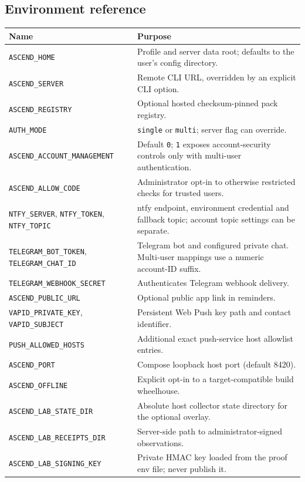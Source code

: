 \subsection{Environment reference}
\begin{longtable}{p{}p{}}
\textbf{Name} & \textbf{Purpose}\\\hline
\texttt{ASCEND\_HOME} & Profile and server data root; defaults to the user's config directory.\\
\texttt{ASCEND\_SERVER} & Remote CLI URL, overridden by an explicit CLI option.\\
\texttt{ASCEND\_REGISTRY} & Optional hosted checksum-pinned pack registry.\\
\texttt{AUTH\_MODE} & \texttt{single} or \texttt{multi}; server flag can override.\\
\texttt{ASCEND\_ACCOUNT\_MANAGEMENT} & Default \texttt{0}; \texttt{1} exposes account-security controls only with multi-user authentication.\\
\texttt{ASCEND\_ALLOW\_CODE} & Administrator opt-in to otherwise restricted checks for trusted users.\\
\texttt{NTFY\_SERVER}, \texttt{NTFY\_TOKEN}, \texttt{NTFY\_TOPIC} & ntfy endpoint, environment credential and fallback topic; account topic settings can be separate.\\
\texttt{TELEGRAM\_BOT\_TOKEN}, \texttt{TELEGRAM\_CHAT\_ID} & Telegram bot and configured private chat. Multi-user mappings use a numeric account-ID suffix.\\
\texttt{TELEGRAM\_WEBHOOK\_SECRET} & Authenticates Telegram webhook delivery.\\
\texttt{ASCEND\_PUBLIC\_URL} & Optional public app link in reminders.\\
\texttt{VAPID\_PRIVATE\_KEY}, \texttt{VAPID\_SUBJECT} & Persistent Web Push key path and contact identifier.\\
\texttt{PUSH\_ALLOWED\_HOSTS} & Additional exact push-service host allowlist entries.\\
\texttt{ASCEND\_PORT} & Compose loopback host port (default 8420).\\
\texttt{ASCEND\_OFFLINE} & Explicit opt-in to a target-compatible build wheelhouse.\\
\texttt{ASCEND\_LAB\_STATE\_DIR} & Absolute host collector state directory for the optional overlay.\\
\texttt{ASCEND\_LAB\_RECEIPTS\_DIR} & Server-side path to administrator-signed observations.\\
\texttt{ASCEND\_LAB\_SIGNING\_KEY} & Private HMAC key loaded from the proof env file; never publish it.\\
\end{longtable}

